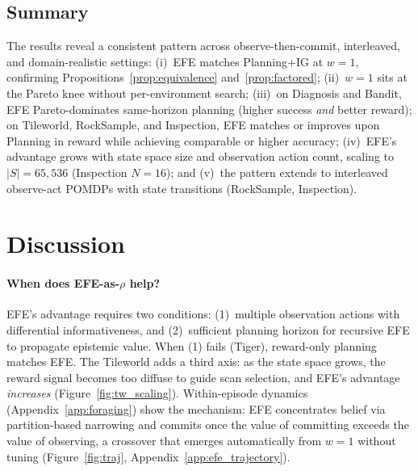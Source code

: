 \documentclass{article}
\begin{document}
\subsection{Summary}

The results reveal a consistent pattern across observe-then-commit, interleaved, and domain-realistic settings: (i)~EFE matches Planning+IG at $w{=}1$, confirming Propositions~\ref{prop:equivalence} and~\ref{prop:factored}; (ii)~$w{=}1$ sits at the Pareto knee without per-environment search; (iii)~on Diagnosis and Bandit, EFE Pareto-dominates same-horizon planning (higher success \emph{and} better reward); on Tileworld, RockSample, and Inspection, EFE matches or improves upon Planning in reward while achieving comparable or higher accuracy; (iv)~EFE's advantage grows with state space size and observation action count, scaling to $|S|{=}65{,}536$ (Inspection $N{=}16$); and (v)~the pattern extends to interleaved observe-act POMDPs with state transitions (RockSample, Inspection).

\section{Discussion}
\label{sec:discussion}

\paragraph{When does EFE-as-$\rho$ help?}
EFE's advantage requires two conditions: (1)~multiple observation actions with differential informativeness, and (2)~sufficient planning horizon for recursive EFE to propagate epistemic value. When (1) fails (Tiger), reward-only planning matches EFE. The Tileworld adds a third axis: as the state space grows, the reward signal becomes too diffuse to guide scan selection, and EFE's advantage \emph{increases} (Figure~\ref{fig:tw_scaling}). Within-episode dynamics (Appendix~\ref{app:foraging}) show the mechanism: EFE concentrates belief via partition-based narrowing and commits once the value of committing exceeds the value of observing, a crossover that emerges automatically from $w{=}1$ without tuning (Figure~\ref{fig:traj}, Appendix~\ref{app:efe_trajectory}).
\end{document}
